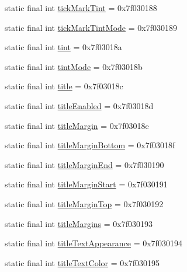 \begin{DoxyCompactItemize}
\item 
static final int \mbox{\hyperlink{classandroid_1_1support_1_1design_1_1_r_1_1attr_a3059c83834df5f9a78fc7f4c496e5c1c}{tick\+Mark\+Tint}} = 0x7f030188
\item 
static final int \mbox{\hyperlink{classandroid_1_1support_1_1design_1_1_r_1_1attr_a27b2ab5fb17a495f470dfb62f0b66d17}{tick\+Mark\+Tint\+Mode}} = 0x7f030189
\item 
static final int \mbox{\hyperlink{classandroid_1_1support_1_1design_1_1_r_1_1attr_a9ed63bec4baad2b129a090cc47ec780b}{tint}} = 0x7f03018a
\item 
static final int \mbox{\hyperlink{classandroid_1_1support_1_1design_1_1_r_1_1attr_a7b7134730f47b14769a92094023c60f9}{tint\+Mode}} = 0x7f03018b
\item 
static final int \mbox{\hyperlink{classandroid_1_1support_1_1design_1_1_r_1_1attr_a457bf617809270ed8af320d41357f187}{title}} = 0x7f03018c
\item 
static final int \mbox{\hyperlink{classandroid_1_1support_1_1design_1_1_r_1_1attr_a4dde193ec35594da99607aa85ad0b723}{title\+Enabled}} = 0x7f03018d
\item 
static final int \mbox{\hyperlink{classandroid_1_1support_1_1design_1_1_r_1_1attr_ab556bea2b89951d8a589842449ab2194}{title\+Margin}} = 0x7f03018e
\item 
static final int \mbox{\hyperlink{classandroid_1_1support_1_1design_1_1_r_1_1attr_a87245c54e5e4a03a199ea283004b986b}{title\+Margin\+Bottom}} = 0x7f03018f
\item 
static final int \mbox{\hyperlink{classandroid_1_1support_1_1design_1_1_r_1_1attr_ae7c626cff9780f4c6e48a3a57fe5df97}{title\+Margin\+End}} = 0x7f030190
\item 
static final int \mbox{\hyperlink{classandroid_1_1support_1_1design_1_1_r_1_1attr_a22d72ed903994a5a154f4d1d51d7d548}{title\+Margin\+Start}} = 0x7f030191
\item 
static final int \mbox{\hyperlink{classandroid_1_1support_1_1design_1_1_r_1_1attr_ada6994d4f765d374fc7ecf540878f62c}{title\+Margin\+Top}} = 0x7f030192
\item 
static final int \mbox{\hyperlink{classandroid_1_1support_1_1design_1_1_r_1_1attr_ac317289ca5428299e0879f393c2097f1}{title\+Margins}} = 0x7f030193
\item 
static final int \mbox{\hyperlink{classandroid_1_1support_1_1design_1_1_r_1_1attr_aa54cad2447fcae6c425d997f842d547e}{title\+Text\+Appearance}} = 0x7f030194
\item 
static final int \mbox{\hyperlink{classandroid_1_1support_1_1design_1_1_r_1_1attr_a61ab4e11b7ddf32429aa917a4436eb81}{title\+Text\+Color}} = 0x7f030195

\end{DoxyCompactItemize}
